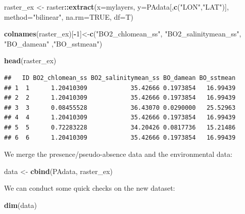 \documentclass[
]{book}
\newenvironment{Shaded}{\begin{snugshade}}{\end{snugshade}}
\newcommand{\AttributeTok}[1]{\textcolor[rgb]{0.13,0.29,0.53}{#1}}
\newcommand{\ConstantTok}[1]{\textcolor[rgb]{0.56,0.35,0.01}{#1}}
\newcommand{\DecValTok}[1]{\textcolor[rgb]{0.00,0.00,0.81}{#1}}
\newcommand{\FunctionTok}[1]{\textcolor[rgb]{0.13,0.29,0.53}{\textbf{#1}}}
\newcommand{\NormalTok}[1]{#1}
\newcommand{\OtherTok}[1]{\textcolor[rgb]{0.56,0.35,0.01}{#1}}
\newcommand{\SpecialCharTok}[1]{\textcolor[rgb]{0.81,0.36,0.00}{\textbf{#1}}}
\newcommand{\StringTok}[1]{\textcolor[rgb]{0.31,0.60,0.02}{#1}}
\begin{document}
\begin{Shaded}
\begin{Highlighting}[]
\NormalTok{raster\_ex }\OtherTok{\textless{}{-}}\NormalTok{ raster}\SpecialCharTok{::}\FunctionTok{extract}\NormalTok{(}\AttributeTok{x=}\NormalTok{mylayers, }\AttributeTok{y=}\NormalTok{PAdata[,}\FunctionTok{c}\NormalTok{(}\StringTok{"LON"}\NormalTok{,}\StringTok{"LAT"}\NormalTok{)], }\AttributeTok{method=}\StringTok{"bilinear"}\NormalTok{, }\AttributeTok{na.rm=}\ConstantTok{TRUE}\NormalTok{, }\AttributeTok{df=}\NormalTok{T) }

\FunctionTok{colnames}\NormalTok{(raster\_ex)[}\SpecialCharTok{{-}}\DecValTok{1}\NormalTok{]}\OtherTok{\textless{}{-}}\FunctionTok{c}\NormalTok{(}\StringTok{"BO2\_chlomean\_ss"}\NormalTok{, }\StringTok{"BO2\_salinitymean\_ss"}\NormalTok{, }\StringTok{"BO\_damean"}\NormalTok{ ,}\StringTok{"BO\_sstmean"}\NormalTok{)}

\FunctionTok{head}\NormalTok{(raster\_ex)}
\end{Highlighting}
\end{Shaded}

\begin{verbatim}
##   ID BO2_chlomean_ss BO2_salinitymean_ss BO_damean BO_sstmean
## 1  1      1.20410309            35.42666 0.1973854   16.99439
## 2  2      1.20410309            35.42666 0.1973854   16.99439
## 3  3      0.08455528            36.43070 0.0290000   25.52963
## 4  4      1.20410309            35.42666 0.1973854   16.99439
## 5  5      0.72283228            34.20426 0.0817736   15.21486
## 6  6      1.20410309            35.42666 0.1973854   16.99439
\end{verbatim}

We merge the presence/pseudo-absence data and the environmental data:

\begin{Shaded}
\begin{Highlighting}[]
\NormalTok{data }\OtherTok{\textless{}{-}} \FunctionTok{cbind}\NormalTok{(PAdata, raster\_ex)}
\end{Highlighting}
\end{Shaded}

We can conduct some quick checks on the new dataset:

\begin{Shaded}
\begin{Highlighting}[]
\FunctionTok{dim}\NormalTok{(data)}
\end{Highlighting}
\end{Shaded}
\end{document}
